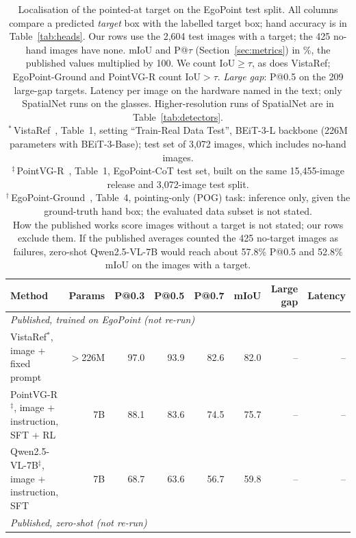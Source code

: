 \begin{table}[t]
  \caption{Localisation of the pointed-at target on the EgoPoint test split. All columns compare a predicted \emph{target} box with the labelled target box; hand accuracy is in Table~\ref{tab:heads}. Our rows use the 2,604 test images with a target; the 425 no-hand images have none. mIoU and P@$\tau$ (Section~\ref{sec:metrics}) in \%, the published values multiplied by 100. We count IoU${\geq}\tau$, as does VistaRef; EgoPoint-Ground and PointVG-R count IoU${>}\tau$. \emph{Large gap}: P@0.5 on the 209 large-gap targets. Latency per image on the hardware named in the text; only SpatialNet runs on the glasses. Higher-resolution runs of SpatialNet are in Table~\ref{tab:detectors}.\\
  $^\ast$\,VistaRef~\cite{li2026vistaref}, Table~1, setting ``Train-Real Data Test'', BEiT-3-L backbone (226M parameters with BEiT-3-Base); test set of 3,072 images, which includes no-hand images.\\
  $^\ddagger$\,PointVG-R~\cite{li2026pointvgr}, Table~1, EgoPoint-CoT test set, built on the same 15,455-image release and 3,072-image test split.\\
  $^\dagger$\,EgoPoint-Ground~\cite{egopoint}, Table~4, pointing-only (POG) task: inference only, given the ground-truth hand box; the evaluated data subset is not stated.\\
  How the published works score images without a target is not stated; our rows exclude them. If the published averages counted the 425 no-target images as failures, zero-shot Qwen2.5-VL-7B would reach about 57.8\% P@0.5 and 52.8\% mIoU on the images with a target.}
  \label{tab:main}
  \footnotesize
  \setlength{\tabcolsep}{3.4pt}
  \begin{tabular}{lrrrrrrr}
    \toprule
    Method & Params & P@0.3 & P@0.5 & P@0.7 & mIoU & Large gap & Latency \\
    \midrule
    \multicolumn{8}{l}{\emph{Published, trained on EgoPoint (not re-run)}} \\
    \quad VistaRef$^\ast$, image + fixed prompt & $>$226M & 97.0 & 93.9 & 82.6 & 82.0 & -- & -- \\
    \quad PointVG-R$^\ddagger$, image + instruction, SFT + RL & 7B & 88.1 & 83.6 & 74.5 & 75.7 & -- & -- \\
    \quad Qwen2.5-VL-7B$^\ddagger$, image + instruction, SFT & 7B & 68.7 & 63.6 & 56.7 & 59.8 & -- & -- \\
    \multicolumn{8}{l}{\emph{Published, zero-shot (not re-run)}} \\

\end{tabular}
\end{table}
